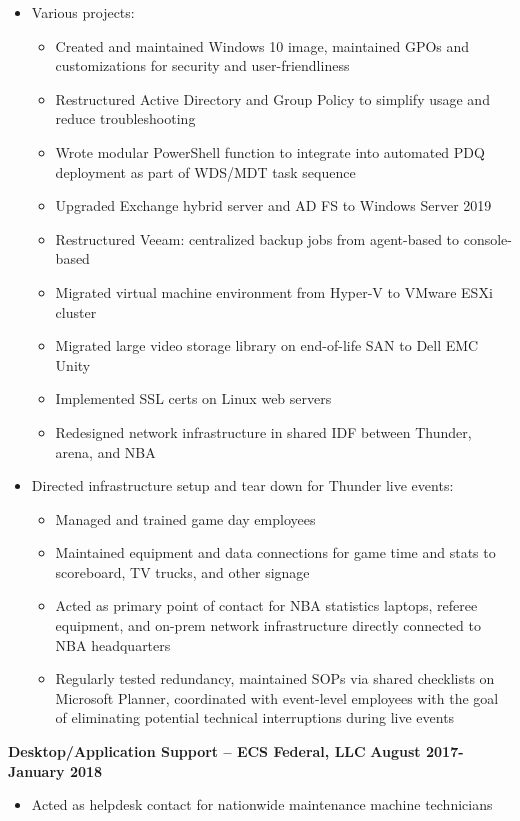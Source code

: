 \documentclass[line]{res}
\begin{document}
\begin{resume}
\begin{itemize}
\begin{itemize}
		\end{itemize}
	\item Various projects:
		\begin{itemize}
			\item Created and maintained Windows 10 image, maintained GPOs and customizations for security and user-friendliness
			\item Restructured Active Directory and Group Policy to simplify usage and reduce troubleshooting
			\item Wrote modular PowerShell function to integrate into automated PDQ deployment as part of WDS/MDT task sequence
			\item Upgraded Exchange hybrid server and AD FS to Windows Server 2019
			\item Restructured Veeam: centralized backup jobs from agent-based to console-based 
			\item Migrated virtual machine environment from Hyper-V to VMware ESXi cluster 
			\item Migrated large video storage library on end-of-life SAN to Dell EMC Unity
			\item Implemented SSL certs on Linux web servers
			\item Redesigned network infrastructure in shared IDF between Thunder, arena, and NBA
		\end{itemize}
	\item Directed infrastructure setup and tear down for Thunder live events:
		\begin{itemize}
			\item Managed and trained game day employees
			\item Maintained equipment and data connections for game time and stats to scoreboard, TV trucks, and other signage
			\item Acted as primary point of contact for NBA statistics laptops, referee equipment, and on-prem network infrastructure directly connected to NBA headquarters 
			\item Regularly tested redundancy, maintained SOPs via shared checklists on Microsoft Planner, coordinated with event-level employees with the goal of eliminating potential technical interruptions during live events
		\end{itemize}
\end{itemize}
\textbf{Desktop/Application Support -- ECS Federal, LLC}
\newline
\textbf{August 2017-January 2018}
	\begin{itemize}
		\item Acted as helpdesk contact for nationwide maintenance machine technicians

\end{itemize}
\end{resume}
\end{document}
